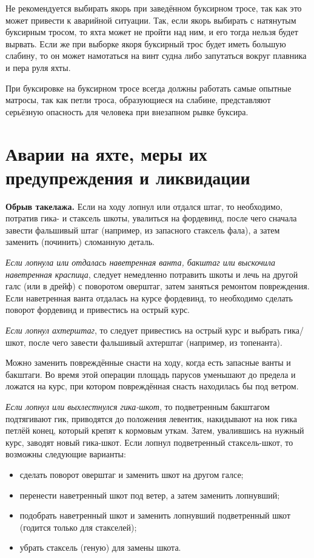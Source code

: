 Не рекомендуется выбирать якорь при заведённом буксирном тросе, так
как это может привести к аварийной ситуации. Так, если якорь выбирать
с натянутым буксирным тросом, то яхта может не пройти над ним, и его
тогда нельзя будет вырвать. Если же при выборке якоря буксирный трос
будет иметь большую слабину, то он может намотаться на винт судна либо
запутаться вокруг плавника и пера руля яхты.

При буксировке на буксирном тросе всегда должны работать самые опытные
матросы, так как петли троса, образующиеся на слабине, представляют
серьёзную опасность для человека при внезапном рывке буксира.

\section{Аварии на яхте, меры их предупреждения и ликвидации}

\textbf{Обрыв такелажа.} Если на ходу лопнул или отдался штаг, то
необходимо, потратив гика- и стаксель шкоты, увалиться на фордевинд,
после чего сначала завести фальшивый штаг (например, из запасного
стаксель фала), а затем заменить (починить) сломанную деталь.

\textit{Если лопнула или отдалась наветренная ванта, бакштаг или выскочила
наветренная краспица}, следует немедленно потравить шкоты и лечь на
другой галс (или в дрейф) с поворотом оверштаг, затем заняться
ремонтом повреждения. Если наветренная ванта отдалась на курсе
фордевинд, то необходимо сделать поворот фордевинд и привестись на
острый курс.

\textit{Если лопнул ахтерштаг}, то следует привестись на острый курс и выбрать
гика\-/шкот, после чего завести фальшивый ахтерштаг (например, из
топенанта).

Можно заменить повреждённые снасти на ходу, когда есть запасные ванты
и бакштаги. Во время этой операции площадь парусов уменьшают до
предела и ложатся на курс, при котором повреждённая снасть находилась
бы под ветром.

\textit{Если лопнул или выхлестнулся гика-шкот}, то подветренным бакштагом
подтягивают гик, приводятся до положения левентик, накидывают на нок
гика петлёй конец, который крепят к кормовым уткам. Затем, увалившись
на нужный курс, заводят новый гика-шкот.  Если лопнул подветренный
стаксель-шкот, то возможны следующие варианты:
\begin{itemize}
\item сделать поворот оверштаг и заменить шкот на другом галсе; 
\item перенести наветренный шкот под ветер, а затем заменить лопнувший; 
\item подобрать наветренный шкот и заменить лопнувший подветренный шкот (годится только для стакселей); 
\item убрать стаксель (геную) для замены шкота. 
\end{itemize}

